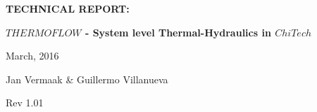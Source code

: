 \documentclass[11pt,letterpaper,titlepage]{article}
\begin{document}
\newcommand{\NSCDOCNUMBR}{NSC-REP-15-X}         %
\newcommand{\NSCDOCSUBJT}{TECHNICAL REPORT: }   %
\newcommand{\NSCDOCTITLE}{$THERMOFLOW$ - System level Thermal-Hydraulics in $ChiTech$}       %
\newcommand{\NSCDOCDATE} {March, 2016}    %
\newcommand{\NSCDOCREV}  {Rev 1.01} %



\begin{titlepage}
	\pagestyle{fancy}
	\vspace*{1.0cm}
	\centering
	\vspace{1cm}
	\vspace{.25cm}
	{\Large\bfseries  \NSCDOCSUBJT \par} 
	{\Large\bfseries \NSCDOCTITLE  \par}
	\vspace{1cm}
	{\Large \NSCDOCDATE \par}
	\vspace{1.0cm}
	{\Large Jan Vermaak \& Guillermo Villanueva \par}
	{\Large \NSCDOCREV \par}
		

	\begin{center}
		\begin{minipage}[c]{0.45\textwidth}
			\begin{figure}[H]
			

\end{figure}
\end{minipage}
\end{center}
\end{titlepage}
\end{document}
